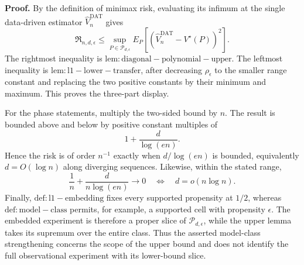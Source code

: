 \textbf{Proof.}
By the definition of minimax risk, evaluating its infimum at the single data-driven estimator \(\widehat V_n^{\mathrm{DAT}}\) gives
\[
 \mathfrak R_{n,d,\epsilon}
 \le\sup_{P\in\mathcal P_{d,\epsilon}}
 E_P[(\widehat V_n^{\mathrm{DAT}}-V^\star(P))^2].
\]
The rightmost inequality is \(\mathrm{lem:diagonal-polynomial-upper}\).  The leftmost inequality is \(\mathrm{lem:l1-lower-transfer}\), after decreasing \(\rho_\epsilon\) to the smaller range constant and replacing the two positive constants by their minimum and maximum.  This proves the three-part display.

For the phase statements, multiply the two-sided bound by \(n\).  The result is bounded above and below by positive constant multiples of
\[
 1+\frac d{\log(en)}.
\]
Hence the risk is of order \(n^{-1}\) exactly when \(d/\log(en)\) is bounded, equivalently \(d=O(\log n)\) along diverging sequences.  Likewise, within the stated range,
\[
 \frac1n+\frac d{n\log(en)}\longrightarrow0
 \quad\Longleftrightarrow\quad
 d=o(n\log n).
\]
Finally, \(\mathrm{def:l1-embedding}\) fixes every supported propensity at \(1/2\), whereas \(\mathrm{def:model-class}\) permits, for example, a supported cell with propensity \(\epsilon\).  The embedded experiment is therefore a proper slice of \(\mathcal P_{d,\epsilon}\), while the upper lemma takes its supremum over the entire class.  Thus the asserted model-class strengthening concerns the scope of the upper bound and does not identify the full observational experiment with its lower-bound slice.